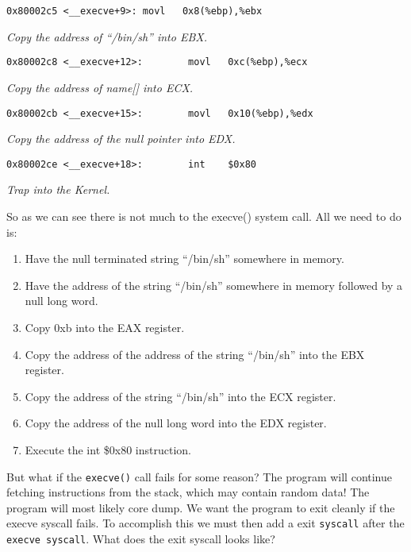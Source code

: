 \documentclass[a4paper]{article}
\begin{document}
\begin{verbatim}
0x80002c5 <__execve+9>: movl   0x8(%ebp),%ebx
\end{verbatim}

\textit{Copy the address of “/bin/sh” into EBX.
}

\begin{verbatim}
0x80002c8 <__execve+12>:        movl   0xc(%ebp),%ecx
\end{verbatim}


\textit{Copy the address of name[] into ECX.
}
\begin{verbatim}
0x80002cb <__execve+15>:        movl   0x10(%ebp),%edx
\end{verbatim}

\textit{Copy the address of the null pointer into EDX.
}

\begin{verbatim}
0x80002ce <__execve+18>:        int    $0x80
\end{verbatim}


\textit{Trap into the Kernel.
}

So as we can see there is not much to the execve() system call. All we need to do is:

\begin{enumerate}
\item Have the null terminated string “/bin/sh” somewhere in memory.
\item Have the address of the string “/bin/sh” somewhere in memory followed by a null long word.
\item Copy 0xb into the EAX register.
\item Copy the address of the address of the string “/bin/sh” into the EBX register.
\item Copy the address of the string “/bin/sh” into the ECX register.
\item Copy the address of the null long word into the EDX register.
\item Execute the int \$0x80 instruction.

\end{enumerate}

But what if the \texttt{execve()} call fails for some reason? The program will continue fetching instructions from the stack, which may contain random data! The program will most likely core dump. We want the program to exit cleanly if the execve syscall fails. To accomplish this we must then add a exit \texttt{syscall} after the \texttt{execve syscall}. What does the exit syscall looks like?
\end{document}
